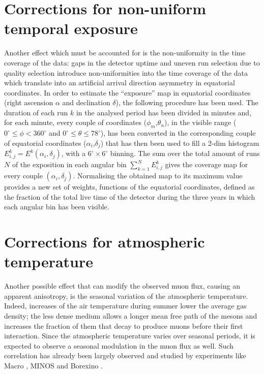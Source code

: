 \documentclass[a4paper]{jpconf}
\begin{document}
\section{Corrections for non-uniform temporal exposure}
Another effect which must be accounted for is the non-uniformity in the time coverage of the data: gaps in the detector uptime and uneven run selection due to quality selection
introduce non-uniformities into the time coverage of the data which translate into an artificial arrival direction asymmetry in equatorial coordinates. 
In order to estimate the ``exposure'' map in equatorial coordinates (right ascension $\alpha$ and declination $\delta$), the following procedure has been used. 
The duration of each run $k$ in the analysed period has been divided in minutes and, for each minute, every couple of coordinates ($\phi_m$,$\theta_n$), in the visible range ($ 0^{\circ} \le \phi < 360^{\circ}$ and $0^{\circ} \le \theta \le 78^{\circ}$), has been converted in the corresponding couple of equatorial coordinates ($\alpha _i$,$\delta _j$) that has then been used to fill a 2-dim histogram $E^k_{i,j}=E^k(\alpha _i , \delta _j)$, with a $6^{\circ} \times 6^{\circ}$ binning.
The sum over the total amount of runs $N$ of the exposition in each angular bin $\sum_{k=1}^{N} E^k_{i,j}$ gives the coverage map for every couple $(\alpha _i , \delta _j)$. Normalising the obtained map to its maximum value provides a new set of weights, functions of the equatorial coordinates, defined as the fraction of the total live time of the detector during the three years in which each angular bin has been visible. 

\section{Corrections for atmospheric temperature}
Another possible effect that can modify the observed muon flux, causing an apparent anisotropy, is the seasonal variation of the atmospheric temperature. Indeed, increases of the air temperature during summer lower the average gas density; the less dense medium allows a longer mean free path of the mesons and increases the fraction of them that decay to produce muons before their first interaction. Since the atmospheric temperature varies over seasonal periods, it is expected to observe a seasonal modulation in the muon flux as well. Such correlation has already been largely observed and studied by experiments like Macro \cite{art:macro}, MINOS \cite {art:minos} and Borexino \cite {art:borexino}. 
\end{document}
